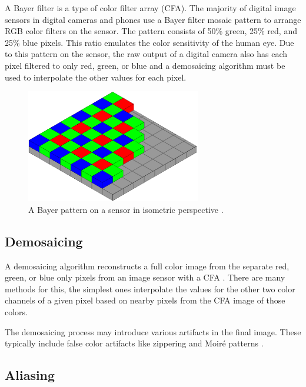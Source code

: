 \documentclass{sig-alternate}
\begin{document}
A Bayer filter is a type of color filter array (CFA). The majority of digital image sensors in digital cameras and phones use a Bayer filter mosaic pattern to arrange RGB color filters on the sensor. The pattern consists of 50\% green, 25\% red, and 25\% blue pixels. This ratio emulates the color sensitivity of the human eye. Due to this pattern on the sensor, the raw output of a digital camera also has each pixel filtered to only red, green, or blue and a demosaicing algorithm must be used to interpolate the other values for each pixel. \cite{wiki:BayerFilter}

\begin{figure}
\centering
\includegraphics[width=3in]{Bayer_pattern_on_sensor}
\caption{A Bayer pattern on a sensor in isometric perspective \cite{wiki:BayerFilter}.}
\label{fig:BayerPattern}
\end{figure}

\subsection{Demosaicing}
\label{sec:background:demosaicing}

A demosaicing algorithm reconstructs a full color image from the separate red, green, or blue only pixels from an image sensor with a CFA \cite{wiki:Demosaicing}. There are many methods for this, the simplest ones interpolate the values for the other two color channels of a given pixel based on nearby pixels from the CFA image of those colors.

The demosaicing process may introduce various artifacts in the final image. These typically include false color artifacts like zippering and Moiré patterns \cite{Wronski2019}.

\subsection{Aliasing}
\label{sec:background:aliasing}
\end{document}
